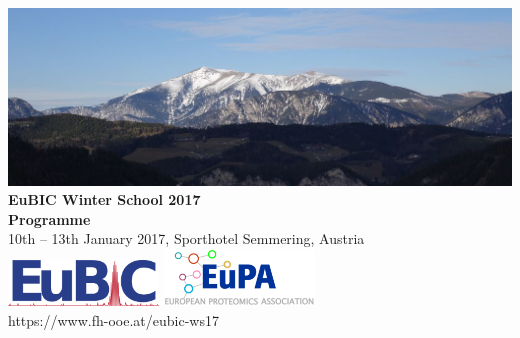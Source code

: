 \thispagestyle{empty}
\begin{titlepage}
  \vspace*{\fill}
	\begin{center}
    \includegraphics[width=\textwidth]{graphics/csm_fhooe-eubic-titelbild_small.jpg}\\[0.5cm]
		{\huge \color{eubicRed} \textbf{EuBIC Winter School 2017}\\[1cm]}
    {\LARGE \textbf{Programme}\\[1cm]}
    {\color{eubicGray} 10th -- 13th January 2017, Sporthotel Semmering, Austria}\\
    \vspace*{3cm}
    \includegraphics[width=0.3\textwidth]{graphics/eubic_logo.png}
    \hspace*{2cm}
    \includegraphics[width=0.3\textwidth]{graphics/eupa-logo.png}\\[1cm]
    {https://www.fh-ooe.at/eubic-ws17\\[0.5cm]}
	\end{center}
  \vspace*{\fill}
\end{titlepage}
